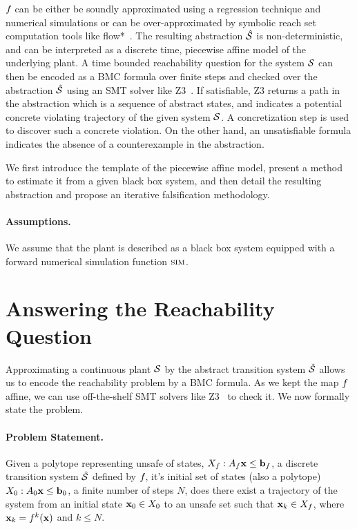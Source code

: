 $f_{}$ can be either be soundly approximated using a regression
technique and numerical simulations or can be over-approximated by
symbolic reach set computation tools like flow*~\cite{chen2013flow}.
The resulting abstraction $\hat{\mathcal{S}}$ is non-deterministic, and can
be interpreted as a discrete time, piecewise affine model of the
underlying plant. A time bounded reachability question for the system
$\mathcal{S}$ can then be encoded as a BMC formula over finite steps and
checked over the abstraction $\hat{\mathcal{S}}$ using an SMT solver like
Z3~\cite{DeMoura+Bjorner/08/Z3}. If satisfiable, Z3 returns a path in
the abstraction which is a sequence of abstract states, and indicates
a potential concrete violating trajectory of the given system $\mathcal{S}$.
A concretization step is used to discover such a concrete violation.
On the other hand, an unsatisfiable formula indicates the absence of a
counterexample in the abstraction.

We first introduce the template of the piecewise affine model, present
a method to estimate it from a given black box system, and then detail
the resulting abstraction and propose an iterative falsification
methodology.

\paragraph {Assumptions.} We assume that the plant is described as a
black box system equipped with a forward numerical simulation function
$\mbox{\sc sim}$.

\section{Answering the Reachability Question}

Approximating a continuous plant $\mathcal{S}$ by the abstract transition
system $\hat{\mathcal{S}}$ allows us to encode the reachability problem by a
BMC formula. As we kept the map $f_{}$ affine, we can use
off-the-shelf SMT solvers like Z3~\cite{DeMoura+Bjorner/08/Z3} to
check it. We now formally state the problem.

\paragraph{Problem Statement.} Given a polytope representing unsafe of
states, $X_f: A_f\mathbf{x} \le \mathbf{b}_f$, a discrete transition system
$\hat{\mathcal{S}}$ defined by $f_{}$, it's initial set of states (also a
polytope) $X_0: A_0\mathbf{x} \le \mathbf{b}_0$, a finite number of steps $N$, does
there exist a trajectory of the system from an initial state $\mathbf{x}_0
\in X_0$ to an unsafe set such that $\mathbf{x}_k \in X_f$, where $\mathbf{x}_k =
f_{}^k(\mathbf{x})$ and $k \le N$.

